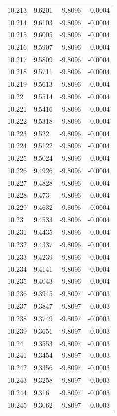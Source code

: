\begin{tabular}{llll}
10.213 & 9.6201 & -9.8096 & -0.0004 \\
10.214 & 9.6103 & -9.8096 & -0.0004 \\
10.215 & 9.6005 & -9.8096 & -0.0004 \\
10.216 & 9.5907 & -9.8096 & -0.0004 \\
10.217 & 9.5809 & -9.8096 & -0.0004 \\
10.218 & 9.5711 & -9.8096 & -0.0004 \\
10.219 & 9.5613 & -9.8096 & -0.0004 \\
10.22 & 9.5514 & -9.8096 & -0.0004 \\
10.221 & 9.5416 & -9.8096 & -0.0004 \\
10.222 & 9.5318 & -9.8096 & -0.0004 \\
10.223 & 9.522 & -9.8096 & -0.0004 \\
10.224 & 9.5122 & -9.8096 & -0.0004 \\
10.225 & 9.5024 & -9.8096 & -0.0004 \\
10.226 & 9.4926 & -9.8096 & -0.0004 \\
10.227 & 9.4828 & -9.8096 & -0.0004 \\
10.228 & 9.473 & -9.8096 & -0.0004 \\
10.229 & 9.4632 & -9.8096 & -0.0004 \\
10.23 & 9.4533 & -9.8096 & -0.0004 \\
10.231 & 9.4435 & -9.8096 & -0.0004 \\
10.232 & 9.4337 & -9.8096 & -0.0004 \\
10.233 & 9.4239 & -9.8096 & -0.0004 \\
10.234 & 9.4141 & -9.8096 & -0.0004 \\
10.235 & 9.4043 & -9.8096 & -0.0004 \\
10.236 & 9.3945 & -9.8097 & -0.0003 \\
10.237 & 9.3847 & -9.8097 & -0.0003 \\
10.238 & 9.3749 & -9.8097 & -0.0003 \\
10.239 & 9.3651 & -9.8097 & -0.0003 \\
10.24 & 9.3553 & -9.8097 & -0.0003 \\
10.241 & 9.3454 & -9.8097 & -0.0003 \\
10.242 & 9.3356 & -9.8097 & -0.0003 \\
10.243 & 9.3258 & -9.8097 & -0.0003 \\
10.244 & 9.316 & -9.8097 & -0.0003 \\
10.245 & 9.3062 & -9.8097 & -0.0003 \\

\end{tabular}
